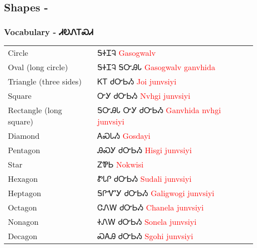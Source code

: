 \begin{multicols}
\index{}
\chapter{Shapes - }
\subsection{Vocabulary - ᏗᎧᏁᎢᏍᏗ 
}
\begin{minipage}{\linewidth}
\begin{tabular}{p{5cm} p{9cm}}
Circle & ᎦᏐᏆᎸ 
 \newline \textcolor{red}{Gasogwalv}\\
Oval (long circle) & ᎦᏐᏆᎸ ᎦᏅᎯᏓ 
 \newline \textcolor{red}{Gasogwalv ganvhida}\\
Triangle (three sides) & ᏦᎢ ᏧᏅᏏᏱ 
 \newline \textcolor{red}{Joi junvsiyi}\\
Square & ᏅᎩ ᏧᏅᏏᏱ 
 \newline \textcolor{red}{Nvhgi junvsiyi}\\
Rectangle (long square) & ᎦᏅᎯᏓ ᏅᎩ ᏧᏅᏏᏱ 
 \newline \textcolor{red}{Ganvhida nvhgi junvsiyi}\\
Diamond & ᎪᏍᏓᏱ 
 \newline \textcolor{red}{Gosdayi}\\
Pentagon & ᎯᏍᎩ ᏧᏅᏏᏱ 
 \newline \textcolor{red}{Hisgi junvsiyi}\\
Star & ᏃᏈᏏ 
 \newline \textcolor{red}{Nokwisi}\\
Hexagon & ᏑᏓᎵ ᏧᏅᏏᏱ 
 \newline \textcolor{red}{Sudali junvsiyi}\\
Heptagon & ᎦᎵᏉᎩ ᏧᏅᏏᏱ 
 \newline \textcolor{red}{Galigwogi junvsiyi}\\
Octagon & ᏣᏁᎳ ᏧᏅᏏᏱ 
 \newline \textcolor{red}{Chanela junvsiyi}\\
Nonagon & ᏐᏁᎳ ᏧᏅᏏᏱ 
 \newline \textcolor{red}{Sonela junvsiyi}\\
Decagon & ᏍᎪᎯ ᏧᏅᏏᏱ 
 \newline \textcolor{red}{Sgohi junvsiyi}\\
\end{tabular}
\end{minipage}


\end{multicols}
